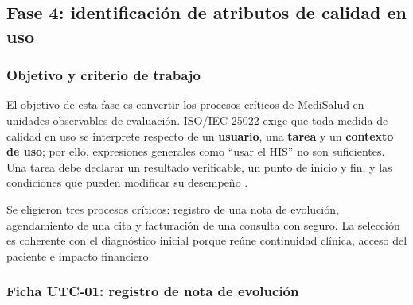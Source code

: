 
\subsection{Fase 4: identificación de atributos de calidad en uso}


\subsubsection{Objetivo y criterio de trabajo}

El objetivo de esta fase es convertir los procesos críticos de MediSalud en unidades observables de evaluación. ISO/IEC 25022 exige que toda medida de calidad en uso se interprete respecto de un \textbf{usuario}, una \textbf{tarea} y un \textbf{contexto de uso}; por ello, expresiones generales como ``usar el HIS'' no son suficientes. Una tarea debe declarar un resultado verificable, un punto de inicio y fin, y las condiciones que pueden modificar su desempeño \cite{iso25022}.

Se eligieron tres procesos críticos: registro de una nota de evolución, agendamiento de una cita y facturación de una consulta con seguro. La selección es coherente con el diagnóstico inicial porque reúne continuidad clínica, acceso del paciente e impacto financiero.

\subsubsection{Ficha UTC-01: registro de nota de evolución}

